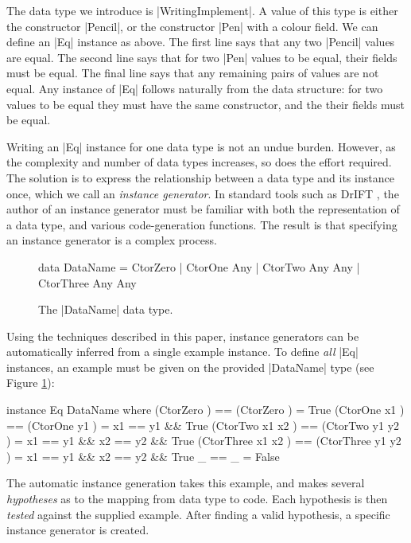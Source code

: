 \documentclass{llncs}
\begin{document}
The data type we introduce is |WritingImplement|. A value of this type is either the constructor |Pencil|, or the constructor |Pen| with a colour field. We can define an |Eq| instance as above. The first line says that any two |Pencil| values are equal. The second line says that for two |Pen| values to be equal, their fields must be equal. The final line says that any remaining pairs of values are not equal. Any instance of |Eq| follows naturally from the data structure: for two values to be equal they must have the same constructor, and the their fields must be equal.

Writing an |Eq| instance for one data type is not an undue burden. However, as the complexity and number of data types increases, so does the effort required. The solution is to express the relationship between a data type and its instance once, which we call an \textit{instance generator}. In standard tools such as DrIFT \cite{drift}, the author of an instance generator must be familiar with both the representation of a data type, and various code-generation functions. The result is that specifying an instance generator is a complex process.

\begin{figure}
\begin{code}
data DataName  =  CtorZero
               |  CtorOne    Any
               |  CtorTwo    Any  Any
               |  CtorThree  Any  Any
\end{code}
\caption{The |DataName| data type.}
\label{fig:dataname}
\end{figure}

Using the techniques described in this paper, instance generators can be automatically inferred from a single example instance. To define \textit{all} |Eq| instances, an example must be given on the provided |DataName| type (see Figure \ref{fig:dataname}):

\begin{code}
instance Eq DataName where
    (CtorZero          )  == (CtorZero          )  = True
    (CtorOne    x1     )  == (CtorOne    y1     )  = x1 == y1 && True
    (CtorTwo    x1 x2  )  == (CtorTwo    y1 y2  )  = x1 == y1 && x2 == y2 && True
    (CtorThree  x1 x2  )  == (CtorThree  y1 y2  )  = x1 == y1 && x2 == y2 && True
    _                     == _                     = False
\end{code}

The automatic instance generation takes this example, and makes several \textit{hypotheses} as to the mapping from data type to code. Each hypothesis is then \textit{tested} against the supplied example. After finding a valid hypothesis, a specific instance generator is created.
\end{document}
